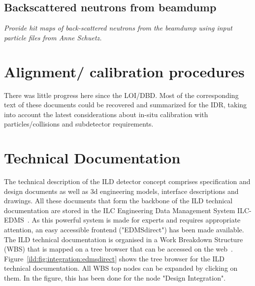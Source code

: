 \subsection{Backscattered neutrons from beamdump}

\textit{Provide hit maps of back-scattered neutrons from the beamdump using input particle files from Anne Schuetz.}

\vspace{2cm}

\section{Alignment/ calibration procedures}

There was little progress here since the LOI/DBD. Most of the corresponding text of these documents could be recovered and summarized for the IDR, taking into account the latest considerations about in-situ calibration with particles/collisions and subdetector requirements.

\vspace{2cm}

\section{Technical Documentation}

The technical description of the ILD detector concept comprises specification and design documents as well as 3d engineering models, interface descriptions and drawings. All these documents that form the backbone of the ILD technical documentation are stored in the ILC Engineering Data Management System ILC-EDMS~\cite{ild:bib:edms}. As this powerful system is made for experts and requires appropriate attention, an easy accessible frontend ("EDMSdirect") has been made available. The ILD technical documentation is organised in a Work Breakdown Structure (WBS) that is mapped on a tree browser that can be accessed on the web~\cite{ild:bib:edmsdirect}. Figure~\ref{ild:fig:integration:edmsdirect} shows the tree browser for the ILD technical documentation. All WBS top nodes can be expanded by clicking on them. In the figure, this has been done for the node "Design Integration".


